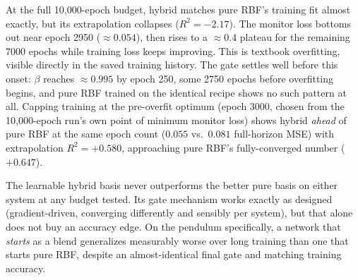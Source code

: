 At the full 10{,}000-epoch budget, hybrid matches pure RBF's training fit
almost exactly, but its extrapolation collapses ($R^2=-2.17$). The monitor
loss bottoms out near epoch 2950 ($\approx0.054$), then rises to a
$\approx0.4$ plateau for the remaining 7000 epochs while training loss keeps
improving. This is textbook overfitting, visible directly in the saved
training history. The gate settles well before this onset: $\beta$ reaches
$\approx0.995$ by epoch 250, some 2750 epochs before overfitting begins, and
pure RBF trained on the identical recipe shows no such pattern at all.
Capping training at the pre-overfit optimum (epoch 3000, chosen from the
10,000-epoch run's own point of minimum monitor loss) shows hybrid
\emph{ahead} of pure RBF at the same epoch count ($0.055$ vs.\ $0.081$
full-horizon MSE) with extrapolation $R^2=+0.580$, approaching pure RBF's
fully-converged number ($+0.647$).

\begin{keypoint}[Verdict]
The learnable hybrid basis never outperforms the better pure basis on either
system at any budget tested. Its gate mechanism works exactly as designed
(gradient-driven, converging differently and sensibly per system), but that
alone does not buy an accuracy edge. On the pendulum specifically, a
network that \emph{starts} as a blend generalizes measurably worse over long
training than one that starts pure RBF, despite an almost-identical final
gate and matching training accuracy.
\end{keypoint}
